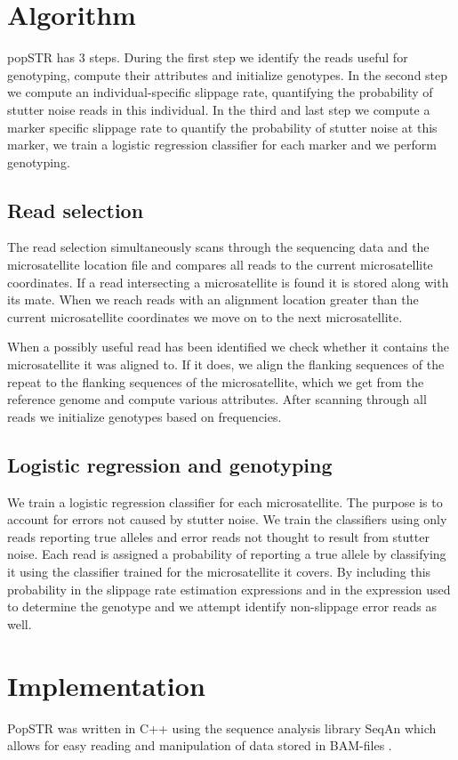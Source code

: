 \documentclass{bioinfo}
\begin{document}
\section{Algorithm}
popSTR has 3 steps. During the first step we identify the reads useful for genotyping, compute their attributes and initialize genotypes. In the second step we compute an individual-specific slippage rate, quantifying the probability of stutter noise reads in this individual. In the third and last step we compute a marker specific slippage rate to quantify the probability of stutter noise at this marker, we train a logistic regression classifier for each marker and we perform genotyping.

\subsection{Read selection}
    The read selection simultaneously scans through the sequencing data and the microsatellite location file and compares all reads to the current microsatellite coordinates. If a read intersecting a microsatellite is found it is stored along with its mate. When we reach reads with an alignment location greater than the current microsatellite coordinates we move on to the next microsatellite.
    
    \noindent When a possibly useful read has been identified we check whether it contains the microsatellite it was aligned to. If it does, we align the flanking sequences of the repeat to the flanking sequences of the microsatellite, which we get from the reference genome and compute various attributes.
    After scanning through all reads we initialize genotypes based on frequencies.
\subsection{Logistic regression and genotyping}
    We train a logistic regression classifier for each microsatellite. The purpose is to account for errors not caused by stutter noise. We train the classifiers using only reads reporting true alleles and error reads not thought to result from stutter noise. Each read is assigned a probability of reporting a true allele by classifying it using the classifier trained for the microsatellite it covers. By including this probability in the slippage rate estimation expressions and in the expression used to determine the genotype and we attempt identify non-slippage error reads as well.
\section{Implementation}
PopSTR was written in C++ using the sequence analysis library SeqAn which allows for easy reading and manipulation of data stored in BAM-files \cite{Doering2008}.
\end{document}
